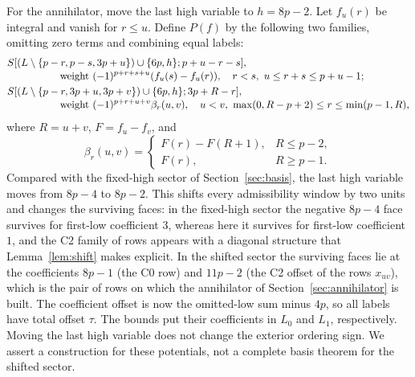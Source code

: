 \documentclass[11pt]{article}
\theoremstyle{definition}
\theoremstyle{remark}
\begin{document}
For the annihilator, move the last high variable to $h=8p-2$.
Let $f_u(r)$ be integral and vanish for $r\leq u$. Define $P(f)$ by
the following two families, omitting zero terms and combining equal labels:
\begin{align}
 &S[(L\setminus\{p-r,p-s,3p+u\})\cup\{6p,h\};p+u-r-s],\notag\\[-3pt]
 &\hspace{18mm}\text{weight }(-1)^{p+r+s+u}(f_u(s)-f_u(r)),
 \quad r<s,\ u\leq r+s\leq p+u-1;\label{eq:Palpha}\\
 &S[(L\setminus\{p-r,3p+u,3p+v\})\cup\{6p,h\};3p+R-r],\notag\\[-3pt]
 &\hspace{18mm}\text{weight }(-1)^{p+r+u+v}\beta_r(u,v),
 \quad u<v,\ \max(0,R-p+2)\leq r\leq\min(p-1,R),\label{eq:Pbeta}
\end{align}
where $R=u+v$, $F=f_u-f_v$, and
\begin{equation}\label{eq:shiftbeta}
 \beta_r(u,v)=\begin{cases}F(r)-F(R+1),&R\leq p-2,\\F(r),&R\geq p-1.
 \end{cases}
\end{equation}
Compared with the fixed-high sector of Section~\ref{sec:basis}, the last high
variable moves from $8p-4$ to $8p-2$. This shifts every admissibility window by
two units and changes the surviving faces: in the fixed-high sector the
negative $8p-4$ face survives for first-low coefficient $3$, whereas here
it survives for first-low coefficient $1$, and the C2 family of rows appears
with a diagonal structure that Lemma~\ref{lem:shift} makes explicit. In the shifted
sector the surviving faces lie at the coefficients $8p-1$ (the C0 row) and $11p-2$
(the C2 offset of the rows $x_{uv}$), which is the pair of rows on which the
annihilator of Section~\ref{sec:annihilator} is built. The coefficient offset is now the omitted-low sum minus $4p$, so all
labels have total offset $\tau$. The bounds put their coefficients in
$L_0$ and $L_1$, respectively. Moving the last high variable does not
change the exterior ordering sign. We assert a construction for these
potentials, not a complete basis theorem for the shifted sector.
\end{document}
